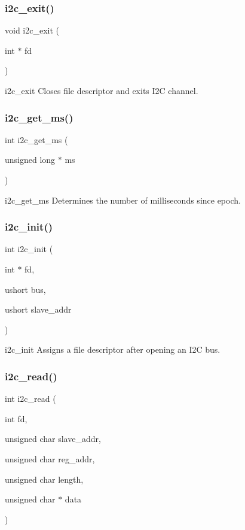 \subsubsection{i2c\+\_\+exit()}
{\footnotesize\ttfamily void i2c\+\_\+exit (\begin{DoxyParamCaption}\item[{int $\ast$}]{fd }\end{DoxyParamCaption})}

i2c\+\_\+exit Closes file descriptor and exits I2C channel. \mbox{\label{i2c_8c_ac453d14ecb36d0b4120fe2300ebe1e88}} 
\subsubsection{i2c\+\_\+get\+\_\+ms()}
{\footnotesize\ttfamily int i2c\+\_\+get\+\_\+ms (\begin{DoxyParamCaption}\item[{unsigned long $\ast$}]{ms }\end{DoxyParamCaption})}

i2c\+\_\+get\+\_\+ms Determines the number of milliseconds since epoch. \mbox{\label{i2c_8c_aca5c7fc94e3f29302d2c3cf690c1abfb}} 
\subsubsection{i2c\+\_\+init()}
{\footnotesize\ttfamily int i2c\+\_\+init (\begin{DoxyParamCaption}\item[{int $\ast$}]{fd,  }\item[{ushort}]{bus,  }\item[{ushort}]{slave\+\_\+addr }\end{DoxyParamCaption})}

i2c\+\_\+init Assigns a file descriptor after opening an I2C bus. \mbox{\label{i2c_8c_a466df9db074b3d42cb3f5420cedc113a}} 
\subsubsection{i2c\+\_\+read()}
{\footnotesize\ttfamily int i2c\+\_\+read (\begin{DoxyParamCaption}\item[{int}]{fd,  }\item[{unsigned char}]{slave\+\_\+addr,  }\item[{unsigned char}]{reg\+\_\+addr,  }\item[{unsigned char}]{length,  }\item[{unsigned char $\ast$}]{data }\end{DoxyParamCaption})}

